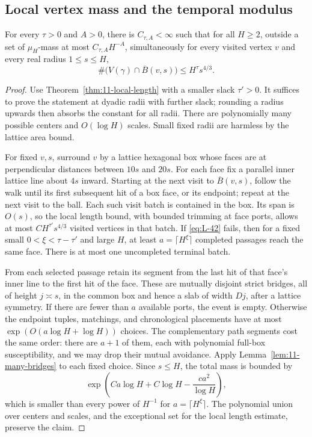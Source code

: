 \subsection{Local vertex mass and the temporal modulus}

\begin{proposition}\label{prop:11-local-mass}
For every $\tau>0$ and $A>0$, there is $C_{\tau,A}<\infty$ such that
for all $H\ge2$, outside a set of $\mu_H$-mass at most
$C_{\tau,A}H^{-A}$, simultaneously for every visited vertex $v$ and
every real radius $1\le s\le H$,
\begin{equation}
 \#\bigl(V(\gamma)\cap\overline B(v,s)\bigr)\le H^\tau s^{4/3}.
 \label{eq:L-42}
\end{equation}
\end{proposition}

\begin{proof}
Use Theorem~\ref{thm:11-local-length} with a smaller slack $\tau'>0$.
It suffices to prove the statement at dyadic radii with further slack;
rounding a radius upwards then absorbs the constant for all radii.
There are polynomially many possible centers and $O(\log H)$ scales.
Small fixed radii are harmless by the lattice area bound.

For fixed $v,s$, surround $v$ by a lattice hexagonal box whose faces
are at perpendicular distances between $10s$ and $20s$. For each face
fix a parallel inner lattice line about $4s$ inward. Starting at the
next visit to $\overline B(v,s)$, follow the walk until its first subsequent hit
of a box face, or its endpoint; repeat at the next visit to the ball.
Each such visit batch is contained in the box. Its span is $O(s)$,
so the local length bound, with bounded trimming at face ports,
allows at most $CH^{\tau'}s^{4/3}$ visited vertices in that batch.
If \eqref{eq:L-42} fails, then for a fixed small
$0<\xi<\tau-\tau'$ and large $H$, at least
$a=\lceil H^\xi\rceil$ completed passages reach the same face.
There is at most one uncompleted terminal batch.

From each selected passage retain its segment from the last hit of
that face's inner line to the first hit of the face. These are
mutually disjoint strict bridges, all of height $j\asymp s$, in the
common box and hence a slab of width $Dj$, after a lattice symmetry.
If there are fewer than $a$ available ports, the event is empty.
Otherwise the endpoint tuples, matchings, and chronological placements have
at most $\exp(O(a\log H+\log H))$ choices. The complementary path
segments cost the same order: there are $a+1$ of them, each with
polynomial full-box susceptibility, and we may drop their mutual
avoidance. Apply Lemma~\ref{lem:11-many-bridges} to each fixed choice.
Since $s\le H$, the total mass is bounded by
\[
 \exp\!\left(Ca\log H+C\log H-\frac{ca^2}{\log H}\right),
\]
which is smaller than every power of $H^{-1}$ for $a=\lceil H^\xi\rceil$.
The polynomial union over centers and scales, and the exceptional
set for the local length estimate, preserve the claim.
\end{proof}


